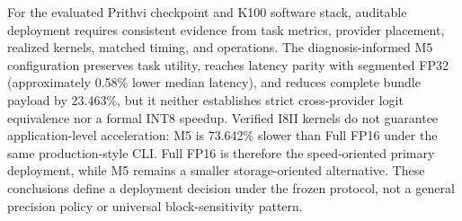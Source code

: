 \documentclass[conference]{IEEEtran}
\begin{document}
For the evaluated Prithvi checkpoint and K100 software stack, auditable deployment requires consistent evidence from task metrics, provider placement, realized kernels, matched timing, and operations. The diagnosis-informed M5 configuration preserves task utility, reaches latency parity with segmented FP32 (approximately 0.58\% lower median latency), and reduces complete bundle payload by 23.463\%, but it neither establishes strict cross-provider logit equivalence nor a formal INT8 speedup. Verified I8II kernels do not guarantee application-level acceleration: M5 is 73.642\% slower than Full FP16 under the same production-style CLI. Full FP16 is therefore the speed-oriented primary deployment, while M5 remains a smaller storage-oriented alternative. These conclusions define a deployment decision under the frozen protocol, not a general precision policy or universal block-sensitivity pattern.



\end{document}
